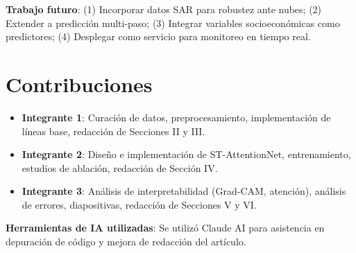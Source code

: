 \documentclass[conference]{IEEEtran}
\begin{document}
\textbf{Trabajo futuro}: (1) Incorporar datos SAR para robustez ante nubes; (2) Extender a predicción multi-paso; (3) Integrar variables socioeconómicas como predictores; (4) Desplegar como servicio para monitoreo en tiempo real.

\section*{Contribuciones}

\begin{itemize}
    \item \textbf{Integrante 1}: Curación de datos, preprocesamiento, implementación de líneas base, redacción de Secciones II y III.

    \item \textbf{Integrante 2}: Diseño e implementación de ST-AttentionNet, entrenamiento, estudios de ablación, redacción de Sección IV.

    \item \textbf{Integrante 3}: Análisis de interpretabilidad (Grad-CAM, atención), análisis de errores, diapositivas, redacción de Secciones V y VI.
\end{itemize}

\textbf{Herramientas de IA utilizadas}: Se utilizó Claude AI para asistencia en depuración de código y mejora de redacción del artículo.
\end{document}
